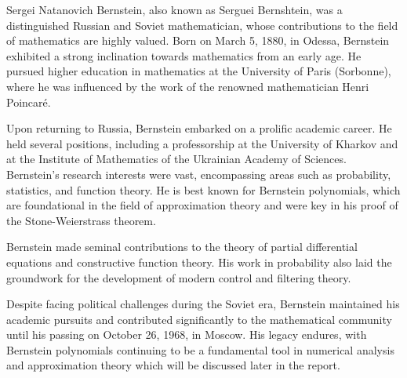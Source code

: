 \documentclass[12pt]{article}
\begin{document}
Sergei Natanovich Bernstein, also known as Serguei Bernshtein, was a distinguished Russian and Soviet mathematician, whose contributions to the field of mathematics are highly valued. Born on March 5, 1880, in Odessa, Bernstein exhibited a strong inclination towards mathematics from an early age. He pursued higher education in mathematics at the University of Paris (Sorbonne), where he was influenced by the work of the renowned mathematician Henri Poincaré.

Upon returning to Russia, Bernstein embarked on a prolific academic career. He held several positions, including a professorship at the University of Kharkov and at the Institute of Mathematics of the Ukrainian Academy of Sciences. Bernstein's research interests were vast, encompassing areas such as probability, statistics, and function theory. He is best known for Bernstein polynomials, which are foundational in the field of approximation theory and were key in his proof of the Stone-Weierstrass theorem.

Bernstein made seminal contributions to the theory of partial differential equations and constructive function theory. His work in probability also laid the groundwork for the development of modern control and filtering theory.

Despite facing political challenges during the Soviet era, Bernstein maintained his academic pursuits and contributed significantly to the mathematical community until his passing on October 26, 1968, in Moscow. His legacy endures, with Bernstein polynomials continuing to be a fundamental tool in numerical analysis and approximation theory which will be discussed later in the report.
\end{document}
